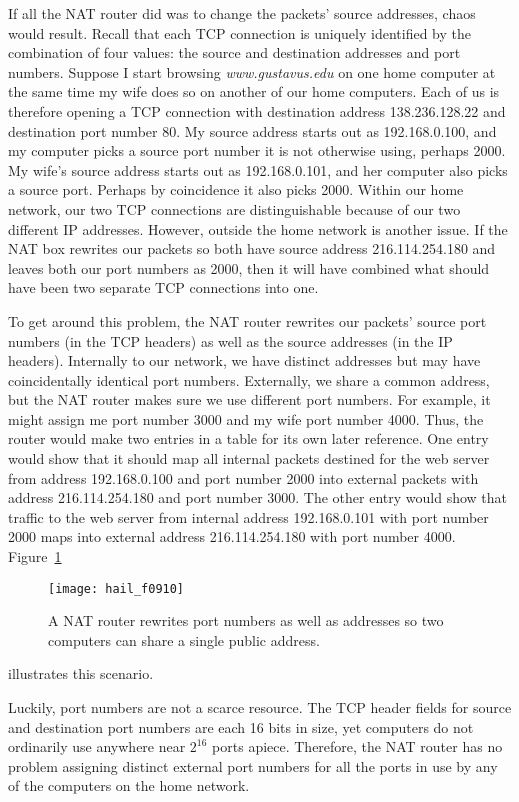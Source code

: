 If all the NAT router did was to change the packets' source addresses,
chaos would result.  Recall that each TCP connection is uniquely
identified by the combination of four values: the source and destination
addresses and port numbers.  Suppose I start browsing \textit{www.gustavus.edu}
on one home computer at the same time my wife does so on another of
our home computers.  Each of us is therefore opening a TCP connection
with destination address 138.236.128.22 and destination port number
80.  My source address starts out as 192.168.0.100, and my computer
picks a source port number it is not otherwise using, perhaps 2000.
My wife's source address starts out as 192.168.0.101, and her computer
also picks a source port.  Perhaps by coincidence it also picks 2000.
Within our home network, our two TCP connections are distinguishable
because of our two different IP addresses.  However, outside the home
network is another issue.  If the NAT box rewrites our packets so both
have source address 216.114.254.180 and leaves both our port numbers
as 2000, then it will have combined what should have been two separate
TCP connections into one.

To get around this problem, the NAT router rewrites our packets'
source port numbers (in the TCP headers) as well as the source
addresses (in the IP headers).  Internally to our network, we have
distinct addresses but may have coincidentally identical port
numbers.  Externally, we share a common address, but the NAT router
makes sure we use different port numbers.  For example, it might
assign me port number 3000 and my wife port number 4000.  Thus, the
router would make two entries in a table for its own later reference.
One entry would show that it should map all internal packets destined
for the web server from
address 192.168.0.100 and port number 2000 into external packets with
address 216.114.254.180 and port number 3000.  The other entry would show
that traffic to the web server from internal address 192.168.0.101 with port number 2000 maps into
external address 216.114.254.180 with port number 4000.
Figure~\ref{scan-9-8}
\begin{figure}
\centerline{\texttt{[image: hail\_f0910]}}
\caption{A NAT router rewrites port numbers as well
  as addresses so two computers can share a single public address.}
\label{scan-9-8}
\end{figure}
illustrates this scenario.

Luckily, port numbers are not a scarce resource.  The TCP header
fields for source and destination port numbers are each 16 bits in
size, yet computers do not ordinarily use anywhere near $2^{16}$ ports
apiece.  Therefore, the NAT router has no problem assigning distinct
external port numbers for all the ports in use by any of the computers
on the home network.

